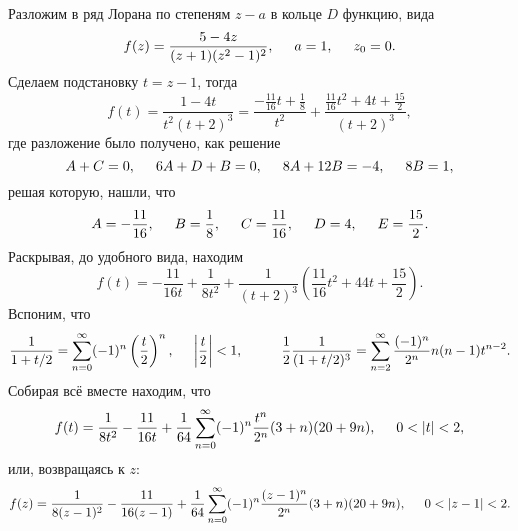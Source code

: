 Разложим в ряд Лорана по степеням $z-a$ в кольце $D$ функцию, вида
\begin{equation*}
    f(z) = \frac{5 - 4z}{(z+1) (z^2 -1)^2}, 
    \hspace{5 mm} 
    a= 1, 
    \hspace{5 mm} 
    z_0 = 0.
\end{equation*}
Сделаем подстановку $t = z-1$, тогда
\begin{equation*}
    f(t) = \frac{1-4 t}{t^2 (t+2)^3} = \frac{-\frac{11}{16} t + \frac{1}{8}}{t^2} + 
    \frac{\frac{11}{16} t^2 + 4 t + \frac{15}{2}}{(t+2)^3},
\end{equation*}
где разложение было получено, как решение
\begin{equation*}
    A + C = 0, 
    \hspace{5 mm} 
    6 A + D + B = 0,
    \hspace{5 mm} 
    8 A + 12 B = -4,
    \hspace{5 mm} 
    8 B = 1,
\end{equation*}
решая которую, нашли, что
\begin{equation*}
    A = - \frac{11}{16}, \hspace{5 mm} 
    B = \frac{1}{8}, \hspace{5 mm} 
    C = \frac{11}{16},     \hspace{5 mm} 
    D = 4, \hspace{5 mm} 
    E = \frac{15}{2}.
\end{equation*}
Раскрывая, до удобного вида, находим
\begin{equation*}
    f(t) = - \frac{11}{16 t} + \frac{1}{8 t^2} + \frac{1}{(t+2)^3} \left(
        \frac{11}{16} t^2 + 4 4t + \frac{15}{2}
    \right).
\end{equation*}
Вспоним, что
\begin{equation*}
    \frac{1}{1 + t/2} = \sum_{n=0}^{\infty} (-1)^n \left(\frac{t}{2}\right)^n,
    \hspace{5 mm} 
    \bigg| \frac{t}{2} \bigg| < 1,
    \hspace{10 mm} 
    \frac{1}{2} \frac{1}{(1 + t/2)^3} = \sum_{n=2}^{\infty} \frac{(-1)^n}{2^n} n (n-1) t^{n-2}.
\end{equation*}
Собирая всё вместе находим, что
\begin{equation*}
    f(t) = \frac{1}{8 t^2} - \frac{11}{16 t} + \frac{1}{64} \sum_{n=0}^{\infty} 
    (-1)^n \frac{t^n}{2^n} (3+n) (20 + 9n),
    \hspace{5 mm} 
    0 < |t| < 2,
\end{equation*}
или, возвращаясь к $z$:
\begin{equation*}
    f(z) = \frac{1}{8 (z-1)^2} - \frac{11}{16 (z-1)} + \frac{1}{64} \sum_{n=0}^{\infty} 
    (-1)^n \frac{(z-1)^n}{2^n} (3+n) (20 + 9n),
    \hspace{5 mm} 
    0 < |z-1| < 2.
\end{equation*}



